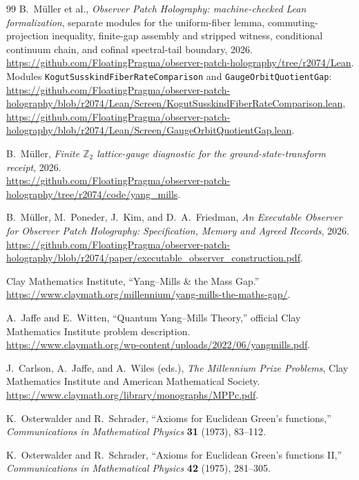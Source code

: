 \documentclass[11pt]{article}
\numberwithin{equation}{section}
\theoremstyle{remark}
\begin{document}
\begin{thebibliography}{99}
B.~M\"uller et al.,
\emph{Observer Patch Holography: machine-checked Lean formalization},
separate modules for the uniform-fiber lemma, commuting-projection inequality,
finite-gap assembly and stripped witness, conditional continuum chain, and
cofinal spectral-tail boundary,
2026.\\
\url{https://github.com/FloatingPragma/observer-patch-holography/tree/r2074/Lean}.\\
Modules \texttt{KogutSusskindFiberRateComparison} and \texttt{GaugeOrbitQuotientGap}:
\url{https://github.com/FloatingPragma/observer-patch-holography/blob/r2074/Lean/Screen/KogutSusskindFiberRateComparison.lean},
\url{https://github.com/FloatingPragma/observer-patch-holography/blob/r2074/Lean/Screen/GaugeOrbitQuotientGap.lean}.

B.~M\"uller,
\emph{Finite \(\mathbb Z_2\) lattice-gauge diagnostic for the ground-state-transform receipt},
2026.\\
\url{https://github.com/FloatingPragma/observer-patch-holography/tree/r2074/code/yang_mills}.

B.~M\"uller, M.~Poneder, J.~Kim, and D.~A.~Friedman,
\emph{An Executable Observer for Observer Patch Holography: Specification,
Memory and Agreed Records}, 2026.\\
\url{https://github.com/FloatingPragma/observer-patch-holography/blob/r2074/paper/executable_observer_construction.pdf}.

Clay Mathematics Institute,
``Yang--Mills \& the Mass Gap.''\\
\url{https://www.claymath.org/millennium/yang-mills-the-maths-gap/}.

A.~Jaffe and E.~Witten,
``Quantum Yang--Mills Theory,''
official Clay Mathematics Institute problem description.\\
\url{https://www.claymath.org/wp-content/uploads/2022/06/yangmills.pdf}.

J.~Carlson, A.~Jaffe, and A.~Wiles (eds.),
\emph{The Millennium Prize Problems},
Clay Mathematics Institute and American Mathematical Society.\\
\url{https://www.claymath.org/library/monographs/MPPc.pdf}.

K.~Osterwalder and R.~Schrader,
``Axioms for Euclidean Green's functions,''
\emph{Communications in Mathematical Physics} \textbf{31} (1973), 83--112.

K.~Osterwalder and R.~Schrader,
``Axioms for Euclidean Green's functions II,''
\emph{Communications in Mathematical Physics} \textbf{42} (1975), 281--305.


\end{thebibliography}
\end{document}
